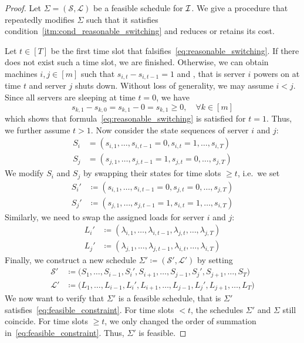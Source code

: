 \begin{proof}
Let $\Sigma=(\mathcal{S},\mathcal{L})$ be a feasible schedule for $\mathcal{I}$. We give a procedure that repeatedly modifies $\Sigma$ such that it satisfies condition~\ref{itm:cond_reasonable_switching} and reduces or retains its cost.
	
Let $t\in[T]$ be the first time slot that falsifies~\eqref{eq:reasonable_switching}. If there does not exist such a time slot, we are finished. Otherwise, we can obtain machines $i,j\in[m]$ such that $s_{i,t}-s_{i,t-1}=1$ and , that is server $i$ powers on at time $t$ and server $j$ shuts down. Without loss of generality, we may assume $i<j$. Since all servers are sleeping at time $t=0$, we have
\begin{equation*}
	s_{k,1}-s_{k,0}=s_{k,1}-0=s_{k,1}\ge 0,\quad\forall k\in[m]
\end{equation*}
which shows that formula~\eqref{eq:reasonable_switching} is satisfied for $t=1$. Thus, we further assume $t>1$. Now consider the state sequences of server $i$ and $j$:
\begin{align*}
	S_i&=(s_{i,1},\dotsc,s_{i,t-1}=0,s_{i,t}=1,\dotsc,s_{i,T})\\
	S_j&=(s_{j,1},\dotsc,s_{j,t-1}=1,s_{j,t}=0,\dotsc,s_{j,T})
\end{align*}
We modify $S_i$ and $S_j$ by swapping their states for time slots $\ge t$, i.e.\ we set
\begin{align*}
	S_i'&\coloneqq(s_{i,1},\dotsc,s_{i,t-1}=0,s_{j,t}=0,\dotsc,s_{j,T})\\
	S_j'&\coloneqq(s_{j,1},\dotsc,s_{j,t-1}=1,s_{i,t}=1,\dotsc,s_{i,T})
\end{align*}
Similarly, we need to swap the assigned loads for server $i$ and $j$:
\begin{align*}
	L_i'&\coloneqq(\lambda_{i,1},\dotsc,\lambda_{i,t-1},\lambda_{j,t},\dotsc,\lambda_{j,T})\\
	L_j'&\coloneqq(\lambda_{j,1},\dotsc,\lambda_{j,t-1},\lambda_{i,t},\dotsc,\lambda_{i,T})
\end{align*}
Finally, we construct a new schedule $\Sigma'\coloneqq(\mathcal{S}',\mathcal{L}')$ by setting
\begin{align*}
	\mathcal{S}'&\coloneqq\bigl(S_1,\dotsc,S_{i-1},S_i',S_{i+1},\dotsc,S_{j-1},S_j',S_{j+1},\dotsc,S_T\bigr)\\
	\mathcal{L}'&\coloneqq\bigl(L_1,\dotsc,L_{i-1},L_i',L_{i+1},\dotsc,L_{j-1},L_j',L_{j+1},\dotsc,L_T\bigr)
\end{align*}
We now want to verify that $\Sigma'$ is a feasible schedule, that is $\Sigma'$ satisfies~\eqref{eq:feasible_constraint}. For time slots $<t$, the schedules $\Sigma'$ and $\Sigma$ still coincide. For time slots $\ge t$, we only changed the order of summation in~\eqref{eq:feasible_constraint}. Thus, $\Sigma'$ is feasible.


\end{proof}
